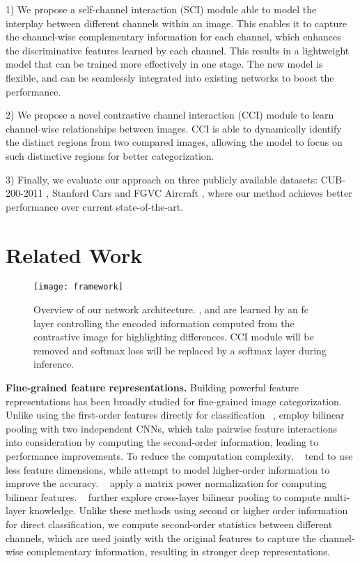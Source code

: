 \documentclass[letterpaper]{article} \usepackage{aaai20}  \usepackage{times}  \usepackage{helvet} \usepackage{courier}  \usepackage[hyphens]{url}  \usepackage{graphicx} \urlstyle{rm} \def\UrlFont{\rm}  \usepackage{graphicx}  \frenchspacing  \setlength{\pdfpagewidth}{8.5in}  \setlength{\pdfpageheight}{11in}  \usepackage{amsmath,amssymb}
\begin{document}
1) We propose a self-channel interaction (SCI) module able to model the interplay between different channels within an image. This enables it to capture the channel-wise complementary  information for each channel, which enhances the discriminative features learned by each channel. This results in a lightweight model that can be trained more effectively in one stage. The new model is flexible, and can be seamlessly integrated into existing networks to boost the performance.

2) We propose a novel contrastive channel interaction (CCI) module to learn channel-wise relationships between images. CCI is able to dynamically identify the distinct regions from two compared images, allowing the model to focus on such distinctive regions for better categorization.

3) Finally, we evaluate our approach on three publicly available datasets: CUB-200-2011 \cite{wah2011caltech}, Stanford Cars \cite{krause20133d} and FGVC Aircraft \cite{DBLP:journals/corr/MajiRKBV13}, where our method achieves better performance over current state-of-the-art.

\section{Related Work}
\begin{figure*}
\begin{center}
\texttt{[image: framework]}
\end{center}
\caption{
Overview of our network architecture. ,  and  are learned by an fc layer controlling the encoded information computed from the contrastive image for highlighting differences. CCI module will be removed and softmax loss will be replaced by a softmax layer during inference.}
\label{approach:whole}
\end{figure*}

\textbf{Fine-grained feature representations.} Building powerful feature representations has been broadly studied for fine-grained image categorization.
Unlike using the first-order features directly for classification ~\cite{zhang2014part,DBLP:journals/pr/WeiXWS18},  \cite{lin2015bilinear} employ bilinear pooling with two independent CNNs, which take pairwise feature interactions into consideration by computing the second-order information, leading  to performance improvements.
To reduce the computation complexity,  ~\cite{DBLP:conf/cvpr/GaoBZD16,DBLP:conf/cvpr/KongF17} tend to use less feature dimensions,
while \cite{DBLP:conf/cvpr/CuiZWLLB17} attempt to model higher-order information to improve the accuracy. ~\cite{DBLP:conf/cvpr/WangLZ17,DBLP:conf/cvpr/LiXWG18} apply a matrix power normalization for computing bilinear features.
~\cite{yu2018hierarchical} further explore cross-layer bilinear pooling to compute multi-layer knowledge.
Unlike these methods using second or higher order information for direct classification, we compute second-order statistics between different channels, which are used jointly with the original features to capture the channel-wise complementary information, resulting in stronger deep representations.
\end{document}
